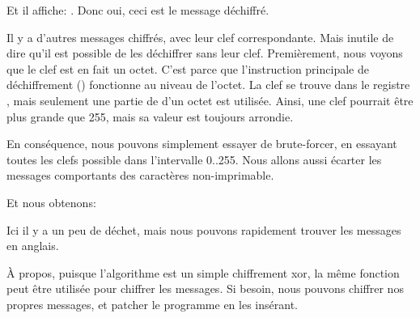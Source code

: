 

Et il affiche: .
Donc oui, ceci est le message déchiffré.

Il y a d'autres messages chiffrés, avec leur clef correspondante.
Mais inutile de dire qu'il est possible de les déchiffrer sans leur clef.
Premièrement, nous voyons que le clef est en fait un octet.
C'est parce que l'instruction principale de déchiffrement (\XOR) fonctionne au niveau
de l'octet.
La clef se trouve dans le registre \ESI, mais seulement une partie de \ESI d'un octet
est utilisée.
Ainsi, une clef pourrait être plus grande que 255, mais sa valeur est toujours arrondie.

En conséquence, nous pouvons simplement essayer de brute-forcer, en essayant toutes
les clefs possible dans l'intervalle 0..255.
Nous allons aussi écarter les messages comportants des caractères non-imprimable.



Et nous obtenons:



Ici il y a un peu de déchet, mais nous pouvons rapidement trouver les messages en
anglais.

À propos, puisque l'algorithme est un simple chiffrement xor, la même fonction peut
être utilisée pour chiffrer les messages.
Si besoin, nous pouvons chiffrer nos propres messages, et patcher le programme en les insérant.
